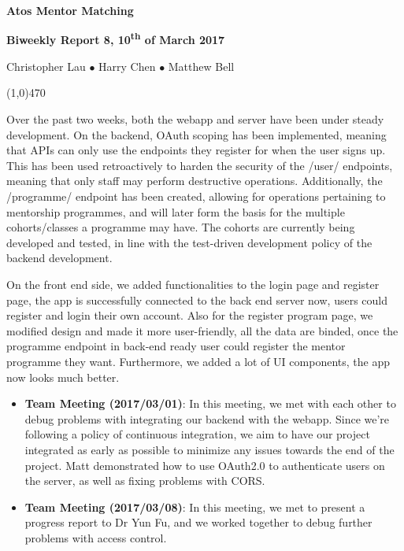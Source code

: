 \documentclass[11pt]{report}
\begin{document}
\centerline{{\LARGE \bf Atos Mentor Matching}}

\centerline{\large \bf Biweekly Report 8, 10\textsuperscript{th} of March 2017}
\centerline{Christopher Lau $\bullet$ Harry Chen $\bullet$ Matthew Bell }
\noindent
\line(1,0){470}\\


\smallskip

\noindent
Over the past two weeks, both the webapp and server have been under steady
development. On the backend, OAuth scoping has been implemented, meaning that
APIs can only use the endpoints they register for when the user signs up. This
has been used retroactively to harden the security of the /user/ endpoints,
meaning that only staff may perform destructive operations. Additionally, the
/programme/ endpoint has been created, allowing for operations pertaining to
mentorship programmes, and will later form the basis for the multiple
cohorts/classes a programme may have. The cohorts are currently being developed
and tested, in line with the test-driven development policy of the backend
development.

On the front end side, we added functionalities to the login page and register
page, the app is successfully connected to the back end server now, users could
register and login their own account. Also for the register program page, we
modified design and made it more user-friendly, all the data are binded, once
the  programme endpoint in back-end ready user could register the mentor
programme they want. Furthermore, we added a lot of UI components, the app now
looks much better.

\bigskip
{}
\smallskip

\noindent
\begin{itemize}
    \item \textbf{Team Meeting (2017/03/01)}: In this meeting, we met with each
        other to debug problems with integrating our backend with the webapp.
        Since we’re following a policy of continuous integration, we aim to have
        our project integrated as early as possible to minimize any issues
        towards the end of the project. Matt demonstrated how to use OAuth2.0 to
        authenticate users on the server, as well as fixing problems with CORS\@.
    \item \textbf{Team Meeting (2017/03/08)}: In this meeting, we met to present
        a progress report to Dr Yun Fu, and we worked together to debug further
        problems with access control. 
\end{itemize}
\end{document}
